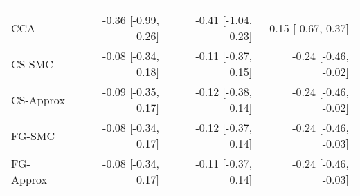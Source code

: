 \documentclass[
  12pt,
  a4paper,
]{article}
\begin{document}
\begin{longtable}[t]{lrrr}
\addlinespace[0.3em]
\multicolumn{4}{l}{\textbf{Year of alloHCT (decades)}}\\
\hspace{1em}CCA & -0.36 [-0.99, 0.26] & -0.41 [-1.04, 0.23] & -0.15 [-0.67, 0.37]\\
\hspace{1em}CS-SMC & -0.08 [-0.34, 0.18] & -0.11 [-0.37, 0.15] & -0.24 [-0.46, -0.02]\\
\hspace{1em}CS-Approx & -0.09 [-0.35, 0.17] & -0.12 [-0.38, 0.14] & -0.24 [-0.46, -0.02]\\
\hspace{1em}FG-SMC & -0.08 [-0.34, 0.17] & -0.12 [-0.37, 0.14] & -0.24 [-0.46, -0.03]\\
\hspace{1em}FG-Approx & -0.08 [-0.34, 0.17] & -0.11 [-0.37, 0.14] & -0.24 [-0.46, -0.03]\\*
\end{longtable}
\endgroup{}
\end{document}
